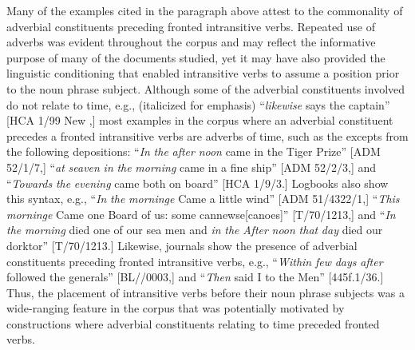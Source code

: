   Many of the examples cited in the paragraph above attest to the commonality of adverbial constituents preceding fronted intransitive verbs. Repeated use of adverbs was evident throughout the corpus and may reflect the informative purpose of many of the documents studied, yet it may have also provided the linguistic conditioning that enabled intransitive verbs to assume a position prior to the noun phrase subject. Although some of the adverbial constituents involved do not relate to time, e.g., (italicized for emphasis) “\textit{likewise} says the captain” [HCA 1/99 New \citealt{Providence1722},] most examples in the corpus where an adverbial constituent precedes a fronted intransitive verbs are adverbs of time, such as the excepts from the following depositions: “\textit{In} \textit{the} \textit{after} \textit{noon} came in the Tiger Prize” [ADM 52/1/7,] “\textit{at} \textit{seaven} \textit{in} \textit{the} \textit{morning} came in a fine ship” [ADM 52/2/3,] and “\textit{Towards} \textit{the} \textit{evening} came both on board” [HCA 1/9/3.] Logbooks also show this syntax, e.g., “\textit{In} \textit{the} \textit{morninge} Came a little wind” [ADM 51/4322/1,] “\textit{This} \textit{morninge} Came one Board of us: some cannewse[canoes]” [T/70/1213,] and “\textit{In} \textit{the} \textit{morning} died one of our sea men and \textit{in} \textit{the} \textit{After} \textit{noon} \textit{that} \textit{day} died our dorktor” [T/70/1213.] Likewise, journals show the presence of adverbial constituents preceding fronted intransitive verbs, e.g., “\textit{Within} \textit{few} \textit{days} \textit{after} followed the generals” [BL/\citealt{Egerton2395}/0003,] and “\textit{Then} said I to the Men” [445f.1/36.] Thus, the placement of intransitive verbs before their noun phrase subjects was a wide-ranging feature in the corpus that was potentially motivated by constructions where adverbial constituents relating to time preceded fronted verbs.  


